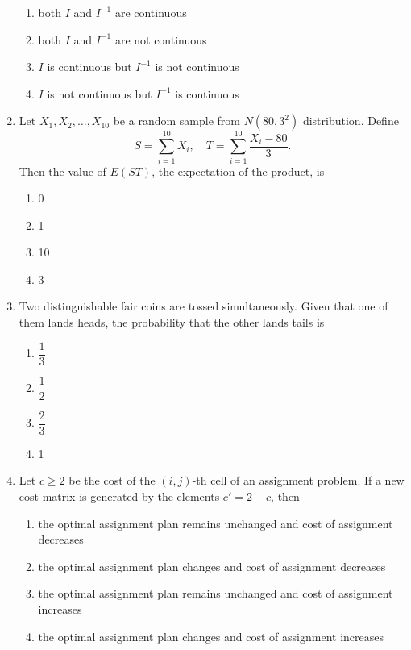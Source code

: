 \documentclass[journal]{IEEEtran}
\numberwithin{equation}{enumi}
\numberwithin{figure}{enumi}
\begin{document}
\begin{enumerate}
\begin{enumerate}
\item both \(I\) and \(I^{-1}\) are continuous
\item both \(I\) and \(I^{-1}\) are not continuous
\item \(I\) is continuous but \(I^{-1}\) is not continuous
\item \(I\) is not continuous but \(I^{-1}\) is continuous
\end{enumerate}


\item Let \(X_1, X_2, \ldots, X_{10}\) be a random sample from \(N(80, 3^2)\) distribution. Define
\[
S = \sum_{i=1}^{10} X_i, \quad T = \sum_{i=1}^{10} \frac{X_i - 80}{3}.
\]
Then the value of \(E(ST)\), the expectation of the product, is
\hfill{}
\begin{multicols}{4}
\begin{enumerate}
\item 0
\item 1
\item 10
\item 3
\end{enumerate}
\end{multicols}

\item Two distinguishable fair coins are tossed simultaneously. Given that one of them lands heads, the probability that the other lands tails is
\hfill{}
\begin{multicols}{4}
\begin{enumerate}
\item \(\dfrac{1}{3}\)
\item \(\dfrac{1}{2}\)
\item \(\dfrac{2}{3}\)
\item 1
\end{enumerate}
\end{multicols}

\item Let \(c \geq 2\) be the cost of the \((i,j)\)-th cell of an assignment problem. If a new cost matrix is generated by the elements \(c' = 2 + c\), then
\hfill{}

\begin{enumerate}
\item the optimal assignment plan remains unchanged and cost of assignment decreases
\item the optimal assignment plan changes and cost of assignment decreases
\item the optimal assignment plan remains unchanged and cost of assignment increases
\item the optimal assignment plan changes and cost of assignment increases
\end{enumerate}



\end{enumerate}
\end{document}
